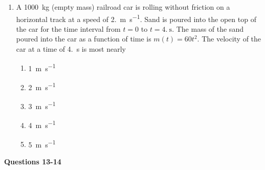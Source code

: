 \documentclass{../../oss-apphys}
\begin{document}
\begin{multicols}{2}
\begin{enumerate}[leftmargin=18pt,resume]

  \item A \SI{1000}{\kilo\gram} (empty mass) railroad car is rolling without
    friction on a horizontal track at a speed of \SI{2.}{\metre\per\second}.
    Sand is poured into the open top of the car for the time interval from
    $t=0$ to $t=\SI{4.}{\second}$. The mass of the sand poured into the car as
    a function of time is $m(t)=60t^2$. The velocity of the car at a time of
    \SI{4.}{\second} is most nearly
    \begin{center}
    \end{center}
    \begin{enumerate}[noitemsep,topsep=0pt,leftmargin=18pt,label=(\Alph*)]
    \item\SI{1}{\metre\per\second}
    \item\SI{2}{\metre\per\second}
    \item\SI{3}{\metre\per\second}
    \item\SI{4}{\metre\per\second}
    \item\SI{5}{\metre\per\second}
    \end{enumerate}
  \end{enumerate}
  \columnbreak
  
  \textbf{Questions 13-14}


\end{multicols}
\end{document}
